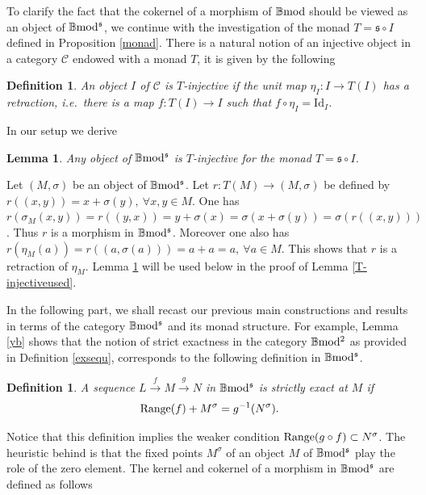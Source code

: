\documentclass[12pt]{article}
\newtheorem{lem}[thm]{Lemma}
\newtheorem{defn}[thm]{Definition}
\def\id{{\rm id}}
\def\B{{\mathbb B}}
\def\strg{strict }
\def\strgly{strictly }
\def\cC{{\mathcal C}}
\newcommand{\ie}{{\it i.e.\/}\ }
\def\id{{\mbox{Id}}}
\def\yb{\mathfrak{s}}
\def\bmod{{\rm \B mod}}
\def\bm2{{\rm \B mod^2}}
\def\b2{{\rm \B mod^{\mathfrak s}}}
\begin{document}
To clarify the fact that the cokernel of a morphism of $\bmod$ should be viewed as an object of $\b2$, we continue with the investigation of the monad $T=\yb \circ I$ defined in Proposition \ref{monad}. 
There is a natural notion of an injective object in a category $\cC$ endowed with a monad $T$, it is given by the following
\begin{defn}\label{T-injective def} An object $I$ of $\cC$ is $T$-injective if the unit map $\eta_I:I\to T(I)$ has a retraction, \ie there is a map $f:T(I)\to I$ such that $f\circ \eta_I=\id_I$.	
\end{defn}
In our setup we derive
\begin{lem}\label{T-injective} Any object of $\b2$ is $T$-injective for the monad $T=\yb \circ I$.	
\end{lem}
\proof Let $(M,\sigma)$ be an object of $\b2$. Let $r:T(M)\to (M,\sigma)$ be defined by
$
r((x,y))=x+\sigma(y),~ \forall x,y\in M
$. 
 One has $r(\sigma_M(x,y))=r((y,x))=y+\sigma(x)=\sigma(x+\sigma(y))=\sigma(r((x,y)))$. Thus $r$ is a morphism in $\b2$. Moreover one also has
 $
 r(\eta_M(a))=r((a,\sigma(a)))=a+a=a,~ \forall a\in M
 $. This shows that 
$r$ is a retraction of $\eta_M$.\endproof 
Lemma \ref{T-injective} will be used below in the proof of Lemma \ref{T-injectiveused}.\vspace{.05in} 

In the following part, we shall recast  our previous main constructions and results in terms of the category $\b2$ and its monad structure. For example, Lemma \ref{yb} shows that the notion of \strg exactness  in the category $\bm2$ as provided in Definition \ref{exsequ}, corresponds to the following definition in $\b2$. 
\begin{defn}\label{exactnessb2} A sequence $L\stackrel{f}{\to} M\stackrel{g}{\to}N$ in $\b2$ is \strgly exact at $M$ if 
\begin{equation}\label{exactnessb21}
	{\rm Range}(f)+M^\sigma=g^{-1} (N^\sigma). 
\end{equation}
 \end{defn}
 Notice that this definition implies the weaker condition ${\rm Range}(g\circ f)\subset N^\sigma$. The heuristic behind is that the fixed points $M^\sigma$ of an object $M$ of $\b2$  play the role of the zero element.  The kernel and cokernel of a morphism in $\b2$ are defined as follows 
 
\end{document}
